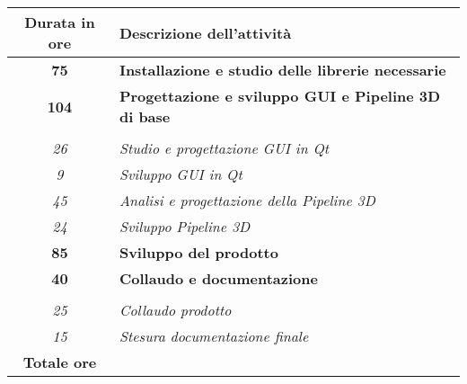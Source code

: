 

\begin{tabularx}{\textwidth}{|c|X|}
	\hline
	\textbf{Durata in ore} & \textbf{Descrizione dell'attività} \\\hline
	
	\textbf{75} & \textbf{Installazione e studio delle librerie necessarie} \\	 
    \hline
    
    \textbf{104} & \textbf{Progettazione e sviluppo GUI e Pipeline 3D di base} \\ \hdashline 
    \multirow{3}{0cm}\\ 
    \textit{26} & 
    \textit{Studio e progettazione GUI in Qt} \\
    \textit{9} & 
    \textit{Sviluppo GUI in Qt} \\
    \textit{45} & 
    \textit{Analisi e progettazione della Pipeline 3D} \\
    \textit{24} & 
    \textit{Sviluppo Pipeline 3D} \\
    \hline
    
    \textbf{85} & \textbf{Sviluppo del prodotto} \\	 
    \hline    
    
    \textbf{40} & \textbf{Collaudo e documentazione}  \\ \hdashline 
    \multirow{4}{0cm}\\ 
    \textit{25} & 
    \textit{Collaudo prodotto} \\
    \textit{15} & 
    \textit{Stesura documentazione finale} \\
    \hline
	
	\textbf{Totale ore} & \multicolumn{1}{|c|}{\textbf{\totaleOre}} \\\hline
	
	
\end{tabularx}
